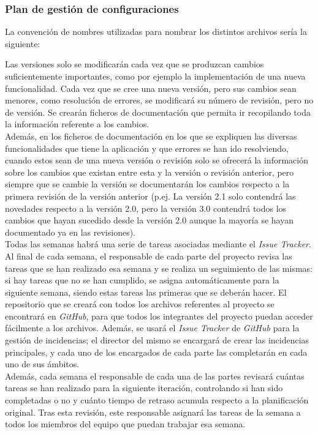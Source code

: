 \documentclass{article}
\begin{document}
\subsubsection{Plan de gestión de configuraciones}
La convención de nombres utilizadas para nombrar los distintos archivos sería la siguiente: 
\begin{figure}[H]
\end{figure}
Las versiones solo se modificarán cada vez que se produzcan cambios suficientemente importantes, como por ejemplo la implementación de una nueva funcionalidad. 
Cada vez que se cree una nueva versión, pero sus cambios sean menores, como resolución de errores, se modificará su número de revisión, pero no de versión. 
Se crearán ficheros de documentación que permita ir recopilando toda la información referente a los cambios.\\
\hfill \break
Además, en los ficheros de documentación en los que se expliquen las diversas funcionalidades que tiene la aplicación y que errores se han ido resolviendo, cuando estos sean de una nueva versión o revisión solo se ofrecerá la información sobre los cambios que existan entre esta y la versión o revisión anterior, pero siempre que se cambie la versión se documentarán los cambios respecto a la primera revisión de la versión anterior (p.ej. La versión 2.1 solo contendrá las novedades respecto a la versión 2.0, pero la versión 3.0 contendrá todos los cambios que hayan sucedido desde la versión 2.0 aunque la mayoría se hayan documentado ya en las revisiones).\\
\hfill \break
Todas las semanas habrá una serie de tareas asociadas mediante el \textit{Issue Tracker}. Al final de cada semana, el responsable de cada parte del proyecto revisa las tareas que se han realizado esa semana y se realiza un seguimiento de las mismas: si hay tareas que no se han cumplido, se asigna automáticamente para la siguiente semana, siendo estas tareas las primeras que se deberán hacer.  
\hfill \break
El repositorio que se creará con todos los archivos referentes al proyecto se encontrará en \textit{GitHub}, para que todos los integrantes del proyecto puedan acceder fácilmente a los archivos. Además, se usará el \textit{Issue Tracker} de \textit{GitHub} para la gestión de incidencias; el director del mismo se encargará de crear las incidencias principales, y cada uno de los encargados de cada parte las completarán en cada uno de sus ámbitos.\\
\hfill \break
Además, cada semana el responsable de cada una de las partes revisará cuántas tareas se han realizado para la siguiente iteración, controlando si han sido completadas o no y cuánto tiempo de retraso acumula respecto a la planificación original.  Tras esta revisión, este responsable asignará las tareas de la semana a todos los miembros del equipo que puedan trabajar esa semana. \\
\end{document}
